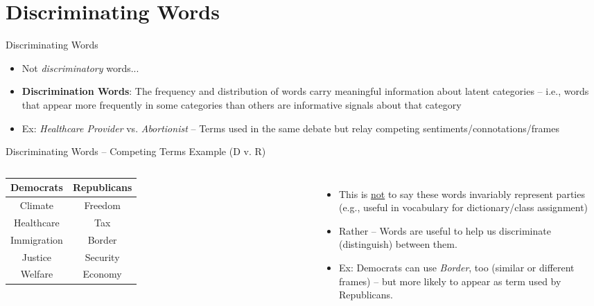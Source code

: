 \documentclass[
  ignorenonframetext,
  aspectratio=169]{beamer}
\begin{document}
\section{Discriminating Words}\label{discriminating-words}

\begin{frame}{Discriminating Words}
\label{discriminating-words-1}
\begin{itemize}
\item Not \textit{discriminatory} words... \par \vspace{2.5mm} \pause
\item \textbf{Discrimination Words}: The frequency and distribution of words carry meaningful information about latent categories – i.e., words that appear more frequently in some categories than others are informative signals about that category  \par \vspace{2.5mm}
\item Ex: \textit{Healthcare Provider} vs. \textit{Abortionist} -- Terms used in the same debate but relay competing sentiments/connotations/frames
\end{itemize}
\end{frame}

\begin{frame}{Discriminating Words -- Competing Terms Example (D v. R)}
\label{discriminating-words-competing-terms-example-d-v.-r}
\begin{columns}
\begin{table}[h!]
\centering
\begin{tabular}{cc}
\toprule
\textbf{Democrats} & \textbf{Republicans} \\
\midrule
Climate     & Freedom  \\
Healthcare  & Tax      \\
Immigration & Border   \\
Justice     & Security \\
Welfare     & Economy  \\
\bottomrule
\end{tabular}
\end{table}
\begin{itemize}
\item This is \underline{not} to say these words invariably represent parties (e.g., useful in vocabulary for dictionary/class assignment) \par \vspace{2.5mm} \pause
\item Rather -- Words are useful to help us discriminate (distinguish) between them.  \par \vspace{2.5mm}
\item Ex: Democrats can use \textit{Border}, too (similar or different frames) -- but more likely to appear as term used by Republicans. 
\end{itemize}
\end{columns}
\end{frame}
\end{document}
